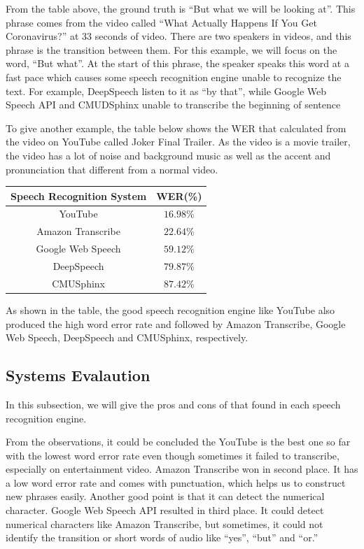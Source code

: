 \documentclass[natbib]{muthesis}
\begin{document}
 From the table above, the ground truth is ``But what we will be looking at''. This phrase comes from the video called ``What Actually Happens If You Get Coronavirus?''\cite{Coronavirus} at 33 seconds of video. There are two speakers in videos, and this phrase is the transition between them. For this example, we will focus on the word, ``But what''. At the start of this phrase, the speaker speaks this word at a fast pace which causes some speech recognition engine unable to recognize the text. For example, DeepSpeech listen to it as ``by that'', while Google Web Speech API and CMUDSphinx unable to transcribe the beginning of sentence
 
 To give another example, the table below shows the WER that calculated from the video on YouTube called Joker Final Trailer. As the video is a movie trailer, the video has a lot of noise and background music as well as the accent and pronunciation that different from a normal video. 

 \begin{center}
 	\begin{tabular}{ |c|c| } 
 		\hline
 		Speech Recognition System & WER(\%)  \\ 
 		\hline
 		YouTube & $16.98\%$  \\ 
 		Amazon Transcribe & $22.64\%$  \\
 		Google Web Speech & $59.12\%$ \\
 		DeepSpeech & $79.87\%$\\
 		CMUSphinx & $87.42\%$ \\
 		\hline
 	\end{tabular}
 \end{center}

 As shown in the table, the good speech recognition engine like YouTube also produced the high word error rate and followed by Amazon Transcribe, Google Web Speech, DeepSpeech and CMUSphinx, respectively.
 
 \subsection{Systems Evalaution}
 In this subsection, we will give the pros and cons of that found in each speech recognition engine. 
 
 
 From the observations, it could be concluded the YouTube is the best one so far with the lowest word error rate even though sometimes it failed to transcribe, especially on entertainment video. Amazon Transcribe won in second place. It has a low word error rate and comes with punctuation, which helps us to construct new phrases easily. Another good point is that it can detect the numerical character. Google Web Speech API resulted in third place. It could detect numerical characters like Amazon Transcribe, but sometimes, it could not identify the transition or short words of audio like ``yes'', ``but'' and ``or.''
 
\end{document}
